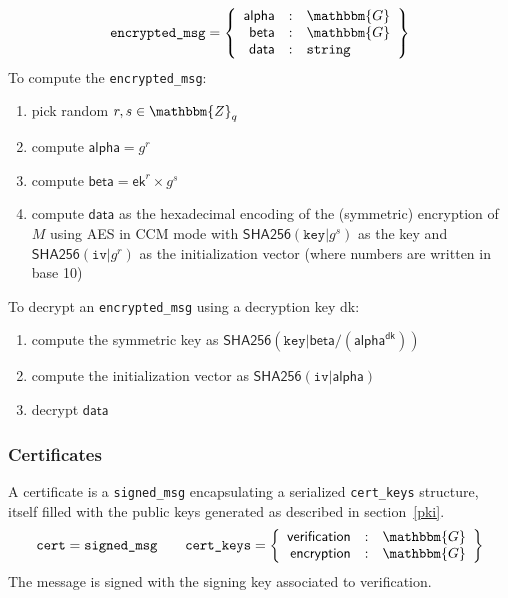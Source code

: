 \documentclass[a4paper]{article}
\newcommand{\G}{\mathbbm{G}}
\newcommand{\Z}{\mathbbm{Z}}
\newcommand{\jstring}{\texttt{string}}
\begin{document}
\begin{gather*}
  \texttt{encrypted\_msg}=\left\{
    \begin{array}{rcl}
      \textsf{alpha}&:&\G\\
      \textsf{beta}&:&\G\\
      \textsf{data}&:&\jstring
    \end{array}
  \right\}
\end{gather*}
To compute the \texttt{encrypted\_msg}:
\begin{enumerate}
\item pick random $r,s\in\Z_q$
\item compute $\textsf{alpha}=g^r$
\item compute $\textsf{beta}=\textsf{ek}^r\times g^s$
\item compute $\textsf{data}$ as the hexadecimal encoding of the (symmetric)
  encryption of $M$ using AES in CCM mode with
  $\textsf{SHA256}(\texttt{key|}g^s)$ as the key and $\textsf{SHA256}(\texttt{iv|}g^r)$ as the
  initialization vector (where numbers are written in base 10)
\end{enumerate}
To decrypt an \texttt{encrypted\_msg} using a decryption key \textsf{dk}:
\begin{enumerate}
\item compute the symmetric key as $\textsf{SHA256}(\texttt{key|}\textsf{beta}/(\textsf{alpha}^{\textsf{dk}}))$
\item compute the initialization vector as $\textsf{SHA256}(\texttt{iv|}\textsf{alpha})$
\item decrypt $\textsf{data}$
\end{enumerate}

\subsubsection{Certificates}
\label{certificates}

A certificate is a \texttt{signed\_msg} encapsulating a serialized
\texttt{cert\_keys} structure, itself filled with the public keys
generated as described in section~\ref{pki}.
\begin{gather*}
  \texttt{cert}=\texttt{signed\_msg}
  \qquad
  \texttt{cert\_keys}=\left\{
    \begin{array}{rcl}
      \textsf{verification}&:&\G\\
      \textsf{encryption}&:&\G
    \end{array}
  \right\}
\end{gather*}
The message is signed with the signing key associated to
\textsf{verification}.
\end{document}
